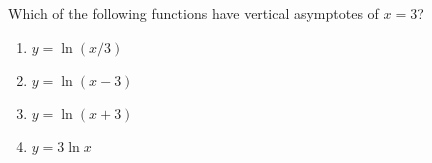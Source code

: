\bigskip

\item Which of the following functions have vertical asymptotes of $x=3$?

\begin{enumerate}
\item $y = \ln (x/3)$
\item $y = \ln ( x - 3)$
\item $y = \ln (x+3)$
\item $y = 3 \ln x$
\end{enumerate}

